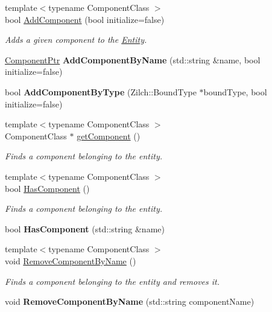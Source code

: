 \begin{DoxyCompactItemize}
\item 
{\footnotesize template$<$typename Component\-Class $>$ }\\bool \hyperlink{classDCEngine_1_1Entity_adf9dfdc2e7a53ff3cc50886cd1252938}{Add\-Component} (bool initialize=false)
\begin{DoxyCompactList}\small\item\em Adds a given component to the \hyperlink{classDCEngine_1_1Entity}{Entity}. \end{DoxyCompactList}\item 
\hypertarget{classDCEngine_1_1Entity_a75fe27665785153e86b47cf6250346d3}{\hyperlink{classDCEngine_1_1Component}{Component\-Ptr} {\bfseries Add\-Component\-By\-Name} (std\-::string \&name, bool initialize=false)}\label{classDCEngine_1_1Entity_a75fe27665785153e86b47cf6250346d3}

\item 
\hypertarget{classDCEngine_1_1Entity_a0b8453f3082bf3d66132856dd248cb5e}{bool {\bfseries Add\-Component\-By\-Type} (Zilch\-::\-Bound\-Type $\ast$bound\-Type, bool initialize=false)}\label{classDCEngine_1_1Entity_a0b8453f3082bf3d66132856dd248cb5e}

\item 
{\footnotesize template$<$typename Component\-Class $>$ }\\Component\-Class $\ast$ \hyperlink{classDCEngine_1_1Entity_a2863c1f74f11065f459ad12593fff42c}{get\-Component} ()
\begin{DoxyCompactList}\small\item\em Finds a component belonging to the entity. \end{DoxyCompactList}\item 
{\footnotesize template$<$typename Component\-Class $>$ }\\bool \hyperlink{classDCEngine_1_1Entity_ae1a11262398d52087ffbae4325a81201}{Has\-Component} ()
\begin{DoxyCompactList}\small\item\em Finds a component belonging to the entity. \end{DoxyCompactList}\item 
\hypertarget{classDCEngine_1_1Entity_a41931919f1b2ae48b0b039db5b0c7abd}{bool {\bfseries Has\-Component} (std\-::string \&name)}\label{classDCEngine_1_1Entity_a41931919f1b2ae48b0b039db5b0c7abd}

\item 
{\footnotesize template$<$typename Component\-Class $>$ }\\void \hyperlink{classDCEngine_1_1Entity_a8baf9eb881b22d81f9c3be329ad06a3b}{Remove\-Component\-By\-Name} ()
\begin{DoxyCompactList}\small\item\em Finds a component belonging to the entity and removes it. \end{DoxyCompactList}\item 
\hypertarget{classDCEngine_1_1Entity_a38dc9bc71dad1e4b6f296d6de9a47cbe}{void {\bfseries Remove\-Component\-By\-Name} (std\-::string component\-Name)}\label{classDCEngine_1_1Entity_a38dc9bc71dad1e4b6f296d6de9a47cbe}


\end{DoxyCompactItemize}
